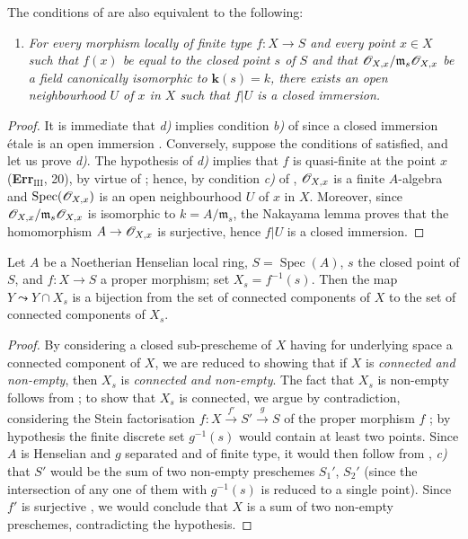 \begin{remark}[18.5.18]
\label{IV.18.5.18}
The conditions of  are also equivalent to the following:
\begin{enumerate}
  \item[\textup{d)}] \itshape For every morphism locally of finite type $f:X\to S$ and every point $x\in X$ such that $f(x)$ be equal to the closed point $s$ of $S$ and that $\mathscr{O}_{X,x}/\mathfrak{m}_s\mathscr{O}_{X,x}$ be a field canonically isomorphic to $\boldsymbol{k}(s)=k$, there exists an open neighbourhood $U$ of $x$ in $X$ such that $f|U$ is a closed immersion.
\end{enumerate}
\end{remark}

\begin{proof}
It is immediate that \emph{d)} implies condition \emph{b)} of  since a closed immersion \'etale is an open immersion .
Conversely, suppose the conditions of  satisfied, and let us prove \emph{d)}.
The hypothesis of \emph{d)} implies that $f$ is quasi-finite at the point $x$ (\textbf{Err}$_{\mathrm{III}}$, 20), by virtue of ;
hence, by condition \emph{c)} of , $\mathscr{O}_{X,x}$ is a finite $A$-algebra and $\operatorname{Spec}(\mathscr{O}_{X,x})$ is an open neighbourhood $U$ of $x$ in $X$.
Moreover, since $\mathscr{O}_{X,x}/\mathfrak{m}_s\mathscr{O}_{X,x}$ is isomorphic to $k=A/\mathfrak{m}_s$, the Nakayama lemma proves that the homomorphism $A\to\mathscr{O}_{X,x}$ is surjective, hence $f|U$ is a closed immersion.
\end{proof}

\begin{proposition}[18.5.19]
\label{IV.18.5.19}
Let $A$ be a Noetherian Henselian local ring, $S=\operatorname{Spec}(A)$, $s$ the closed point of $S$, and $f:X\to S$ a proper morphism;
set $X_s=f^{-1}(s)$.
Then the map $Y\leadsto Y\cap X_s$ is a bijection from the set of connected components of $X$ to the set of connected components of $X_s$.
\end{proposition}

\begin{proof}
By considering a closed sub-prescheme of $X$ having for underlying space a connected component of $X$, we are reduced to showing that if $X$ is \emph{connected and non-empty}, then $X_s$ is \emph{connected and non-empty}.
The fact that $X_s$ is non-empty follows from ;
to show that $X_s$ is connected, we argue by contradiction, considering the Stein factorisation $f:X\xrightarrow{f'}S'\xrightarrow{g}S$ of the proper morphism $f$ ;
by hypothesis the finite discrete set $g^{-1}(s)$ would contain at least two points.
Since $A$ is Henselian and $g$ separated and of finite type, it would then follow from , \emph{c)} that $S'$ would be the sum of two non-empty preschemes $S_1'$, $S_2'$ (since the intersection of any one of them with $g^{-1}(s)$ is reduced to a single point).
Since $f'$ is surjective , we would conclude that $X$ is a sum of two non-empty preschemes, contradicting the hypothesis.
\end{proof}
